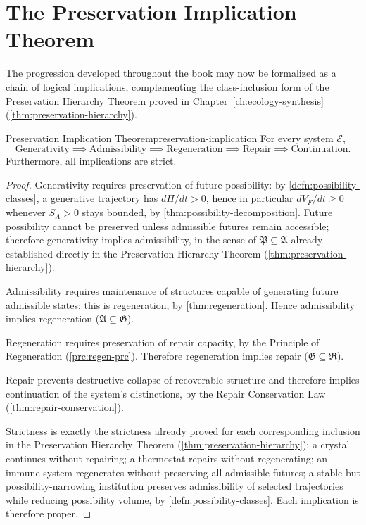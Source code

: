 \documentclass[12pt,twoside,openright]{book}
\begin{document}
\section{The Preservation Implication Theorem}
\label{sec:ch31-implication}

The progression developed throughout the book may now be
formalized as a chain of logical implications, complementing
the class-inclusion form of the Preservation Hierarchy
Theorem proved in Chapter~\ref{ch:ecology-synthesis}
(\cref{thm:preservation-hierarchy}).

\begin{theorem}{Preservation Implication Theorem}{preservation-implication}
  For every system $\mathcal{E}$,
  \[
    \text{Generativity} \implies \text{Admissibility}
    \implies \text{Regeneration} \implies \text{Repair}
    \implies \text{Continuation}.
  \]
  Furthermore, all implications are strict.
\end{theorem}

\begin{proof}
  Generativity requires preservation of future possibility:
  by \cref{defn:possibility-classes}, a generative
  trajectory has $d\Pi/dt > 0$, hence in particular
  $dV_F/dt \ge 0$ whenever $S_A>0$ stays bounded, by
  \cref{thm:possibility-decomposition}. Future possibility
  cannot be preserved unless admissible futures remain
  accessible; therefore generativity implies admissibility,
  in the sense of $\mathfrak{P}\subseteq\mathfrak{A}$
  already established directly in the Preservation
  Hierarchy Theorem (\cref{thm:preservation-hierarchy}).

  Admissibility requires maintenance of structures capable
  of generating future admissible states: this is
  regeneration, by \cref{thm:regeneration}. Hence
  admissibility implies regeneration
  ($\mathfrak{A}\subseteq\mathfrak{G}$).

  Regeneration requires preservation of repair capacity, by
  the Principle of Regeneration (\cref{prc:regen-prc}).
  Therefore regeneration implies repair
  ($\mathfrak{G}\subseteq\mathfrak{R}$).

  Repair prevents destructive collapse of recoverable
  structure and therefore implies continuation of the
  system's distinctions, by the Repair Conservation Law
  (\cref{thm:repair-conservation}).

  Strictness is exactly the strictness already proved for
  each corresponding inclusion in the Preservation Hierarchy
  Theorem (\cref{thm:preservation-hierarchy}): a crystal
  continues without repairing; a thermostat repairs without
  regenerating; an immune system regenerates without
  preserving all admissible futures; a stable but
  possibility-narrowing institution preserves admissibility
  of selected trajectories while reducing possibility
  volume, by \cref{defn:possibility-classes}. Each
  implication is therefore proper.
\end{proof}
\end{document}
